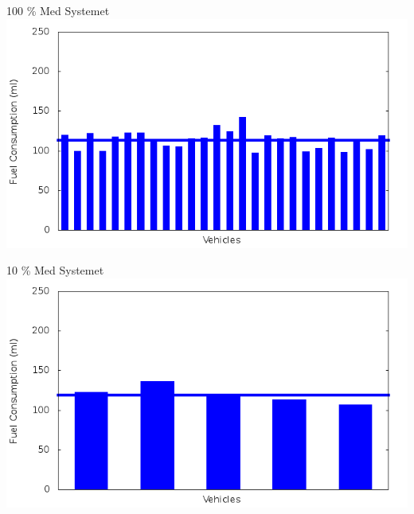 \begin{frame}{100 \% Med Systemet}
\includegraphics[width=1\textwidth]{images/fuelRouteControlled100.png}
\end{frame}


\begin{frame}{10 \% Med Systemet}
\includegraphics[width=1\textwidth]{images/fuelRouteControlled10.png}
\end{frame}




